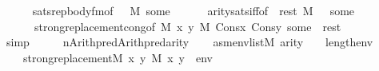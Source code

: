 \begin{isabellebody}
\ \ \ \ \isamarkupfalse%
\ sats{\isacharunderscore}{\kern0pt}rep{\isacharunderscore}{\kern0pt}body{\isacharunderscore}{\kern0pt}fm{\isacharbrackleft}{\kern0pt}of\ {\isasymphi}\ {\isachardoublequoteopen}{\isacharbrackleft}{\kern0pt}{\isacharbrackright}{\kern0pt}{\isachardoublequoteclose}\ M\ some{\isacharbrackright}{\kern0pt}\isanewline
\ \ \ \ \ \ arity{\isacharunderscore}{\kern0pt}sats{\isacharunderscore}{\kern0pt}iff{\isacharbrackleft}{\kern0pt}of\ {\isasymphi}\ rest\ M\ {\isachardoublequoteopen}{\isacharbrackleft}{\kern0pt}{\isacharunderscore}{\kern0pt}{\isacharcomma}{\kern0pt}{\isacharunderscore}{\kern0pt}{\isacharbrackright}{\kern0pt}\ {\isacharat}{\kern0pt}\ some{\isachardoublequoteclose}{\isacharbrackright}{\kern0pt}\isanewline
\ \ \ \ \ \ strong{\isacharunderscore}{\kern0pt}replacement{\isacharunderscore}{\kern0pt}cong{\isacharbrackleft}{\kern0pt}of\ {\isachardoublequoteopen}{\isacharhash}{\kern0pt}{\isacharhash}{\kern0pt}M{\isachardoublequoteclose}\ {\isachardoublequoteopen}{\isasymlambda}x\ y{\isachardot}{\kern0pt}\ M{\isacharcomma}{\kern0pt}\ Cons{\isacharparenleft}{\kern0pt}x{\isacharcomma}{\kern0pt}\ Cons{\isacharparenleft}{\kern0pt}y{\isacharcomma}{\kern0pt}\ some\ {\isacharat}{\kern0pt}\ rest{\isacharparenright}{\kern0pt}{\isacharparenright}{\kern0pt}\ {\isasymTurnstile}\ {\isasymphi}{\isachardoublequoteclose}\ {\isacharunderscore}{\kern0pt}\ {\isacharbrackright}{\kern0pt}\isanewline
\ \ \ \ \isamarkupfalse%
\ simp\isanewline
{}\isamarkupfalse%
\ %
\isanewline
\ \ \isamarkupfalse%
\ {\isacharquery}{\kern0pt}n{\isacharequal}{\kern0pt}{\isachardoublequoteopen}Arith{\isachardot}{\kern0pt}pred{\isacharparenleft}{\kern0pt}Arith{\isachardot}{\kern0pt}pred{\isacharparenleft}{\kern0pt}arity{\isacharparenleft}{\kern0pt}{\isasymphi}{\isacharparenright}{\kern0pt}{\isacharparenright}{\kern0pt}{\isacharparenright}{\kern0pt}{\isachardoublequoteclose}\isanewline
\ \ \isamarkupfalse%
\ asm{\isacharcolon}{\kern0pt}{\isachardoublequoteopen}{\isasymforall}env{\isasymin}list{\isacharparenleft}{\kern0pt}M{\isacharparenright}{\kern0pt}{\isachardot}{\kern0pt}\ arity{\isacharparenleft}{\kern0pt}{\isasymphi}{\isacharparenright}{\kern0pt}\ {\isasymle}\ {}\ {\isacharhash}{\kern0pt}{\isacharplus}{\kern0pt}\ length{\isacharparenleft}{\kern0pt}env{\isacharparenright}{\kern0pt}\ {\isasymlongrightarrow}\ \isanewline
\ \ \ \ strong{\isacharunderscore}{\kern0pt}replacement{\isacharparenleft}{\kern0pt}{\isacharhash}{\kern0pt}{\isacharhash}{\kern0pt}M{\isacharcomma}{\kern0pt}\ {\isasymlambda}x\ y{\isachardot}{\kern0pt}\ M{\isacharcomma}{\kern0pt}\ {\isacharbrackleft}{\kern0pt}x{\isacharcomma}{\kern0pt}\ y{\isacharbrackright}{\kern0pt}\ {\isacharat}{\kern0pt}\ env\ {\isasymTurnstile}\ {\isasymphi}{\isacharparenright}{\kern0pt}{\isachardoublequoteclose}\isanewline

\end{isabellebody}
